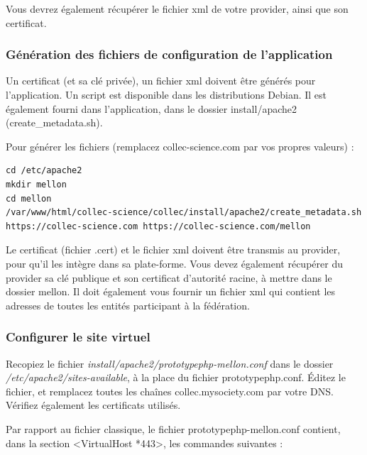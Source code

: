   
Vous devrez également récupérer le fichier xml de votre provider, ainsi que son certificat.

\subsubsection{Génération des fichiers de configuration de l’application}

Un certificat (et sa clé privée), un fichier xml doivent être générés pour l’application. Un script est disponible dans les distributions Debian. Il est également fourni dans l’application, dans le dossier install/apache2 (create\_metadata.sh).

Pour générer les fichiers (remplacez collec-science.com par vos propres valeurs) :

\begin{lstlisting}
cd /etc/apache2
mkdir mellon
cd mellon
/var/www/html/collec-science/collec/install/apache2/create_metadata.sh https://collec-science.com https://collec-science.com/mellon
\end{lstlisting}

Le certificat (fichier .cert) et le fichier xml doivent être transmis au provider, pour qu’il les intègre dans sa plate-forme. Vous devez également récupérer du provider sa clé publique et son certificat d’autorité racine, à mettre dans le dossier mellon. Il doit également vous fournir un fichier xml qui contient les adresses de toutes les entités participant à la fédération.

\subsubsection{Configurer le site virtuel}

Recopiez le fichier \textit{install/apache2/prototypephp-mellon.conf} dans le dossier \textit{/etc/apache2/sites-available}, à la place du fichier prototypephp.conf. Éditez le fichier, et remplacez toutes les chaînes collec.mysociety.com par votre DNS. Vérifiez également les certificats utilisés.

Par rapport au fichier classique, le fichier prototypephp-mellon.conf contient, dans la section <VirtualHost *443>, les commandes suivantes :


